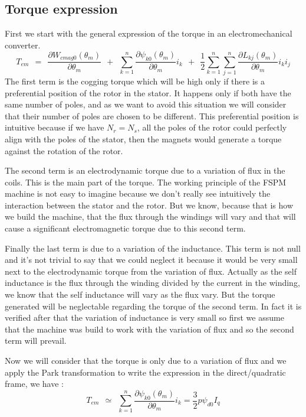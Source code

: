 \subsection{Torque expression}
First we start with the general expression of the torque in an electromechanical converter.
$$ T_{em} ~~ = ~~  \frac{\partial W_{cmag0}(\theta_{m})}{\partial \theta_{m}} ~~+~~ \sum_{k=1}^{n} \frac{\partial \psi_{k0}(\theta_{m})}{\partial \theta_{m}} i_{k} ~~+~~ \frac{1}{2} \sum_{k=1}^{n} \sum_{j=1}^{n} \frac{\partial L_{kj}(\theta_{m})}{\partial \theta_{m}} i_{k}i_{j} $$
The first term is the cogging torque which will be high only if there is a preferential position of the rotor in the stator. It happens only if both have the same number of poles, and as we want to avoid this situation we will consider that their number of poles are chosen to be different. This preferential position is intuitive because if we have $N_{r} = N_{s}$, all the poles of the rotor could perfectly align with the poles of the stator, then the magnets would generate a torque against the rotation of the rotor.

The second term is an electrodynamic torque due to a variation of flux in the coils. This is the main part of the torque. The working principle of the FSPM machine is not easy to imagine because we don't really see intuitively the interaction between the stator and the rotor. But we know, because that is how we build the machine, that the flux through the windings will vary and that will cause a significant electromagnetic torque due to this second term.

Finally the last term is due to a variation of the inductance. This term is not null and it's not trivial to say that we could neglect it because it would be very small next to the electrodynamic torque from the variation of flux. Actually as the self inductance is the flux through the winding divided by the current in the winding, we know that the self inductance will vary as the flux vary. But the torque generated will be neglectable regarding the torque of the second term. In fact it is verified after that the variation of inductance is very small so first we assume that the machine was build to work with the variation of flux and so the second term will prevail. 

Now we will consider that the torque is only due to a variation of flux and we apply the Park transformation to write the expression in the direct/quadratic frame, we have : 
$$ T_{em} ~~ \simeq ~~  \sum_{k=1}^{n} \frac{\partial \psi_{k0}(\theta_{m})}{\partial \theta_{m}} i_{k} = \frac{3}{2} p\psi_{d0}I_{q}$$

